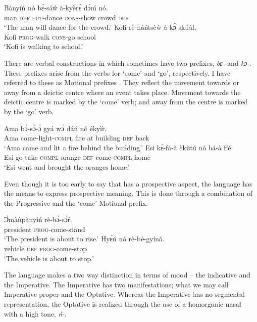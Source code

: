 \documentclass[output=paper]{langsci/langscibook}
\begin{document}
\ea\label{ex:8.osam}
\ea\label{ex:8a.osam}
\gll  Bànyíń  nó  bɛ́-sáẃ   à-kyèrɛ́    dɔ́ḿ  nó.\\
       man  \textsc{def}  \textsc{fut}-dance  \textsc{cons}-show  crowd  \textsc{def}\\
\glt   `The man will dance for the crowd.'
\ex\label{ex:8b.osam}
\gll    Kofi  rè-náńtsèẁ  à-kɔ̀    skúùl.\\
       Kofi  \textsc{prog}-walk  \textsc{cons}-go  school\\
\glt   `Kofi is walking to school.'
\z 
\z 


There are verbal constructions in  which sometimes have two prefixes, \textit{bɛ-} and \textit{kɔ-}. These prefixes arise from the verbs for `come' and `go', respectively. I have referred to these as Motional prefixes \citep{osam2002}. They reflect the movement towards or away from a deictic centre where an event takes place. Movement towards the deictic centre is marked by the `come' verb; and away from the centre is marked by the `go' verb. 

\ea\label{ex:9.osam}
\ea\label{ex:9a.osam}
\gll Ama  bɔ̀-sɔ́-ɔ̀      gyá  wɔ̀  dáń    nó  ékyì\`{r}.\\
       Ama  come-light-\textsc{compl}  fire  at  building  \textsc{def}  back\\
\glt   `Ama came and lit a fire behind the building.'
\ex\label{ex:9b.osam}
\gll  Esi  kɛ̀-fá-à      èkùtú    nó  bá-à    fíé.\\
       Esi  go-take-\textsc{compl}  orange    \textsc{def}  come-\textsc{compl}  home\\
\glt   `Esi went and brought the oranges home.'
\z 
\z 

Even though it is too early to say that  has a prospective aspect, the language has the means to express prospective meaning. This is done through a combination of the Progressive and the `come' Motional prefix.

\ea\label{ex:10.osam}
\ea\label{ex:10a.osam}
\gll   Ɔ̀màǹpànyíń  rè-bɔ́-sɔ́ŕ.\\
       president  \textsc{prog}-come-stand\\
\glt   `The president is about to rise.'
\ex\label{ex:10b.osam}
\gll    Hyɛ́ń    nó  rè-bé-gyíná.\\
       vehicle    \textsc{def}  \textsc{prog}-come-stop\\
\glt   `The vehicle is about to stop.'
\z 
\z 

The language makes a two way distinction in terms of mood -- the indicative and the Imperative. The Imperative has two manifestations; what we may call Imperative proper and the Optative. Whereas the Imperative has no segmental representation, the Optative is realized through the use of a homorganic nasal with a high tone, \textit{ń-}. 
\end{document}
